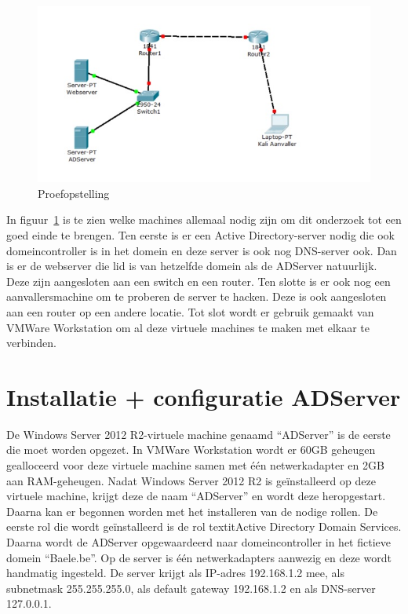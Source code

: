 \documentclass[pdftex,a4paper,12pt]{report}
\begin{document}
\begin{figure}[H]
\begin{center}
\includegraphics{img/Situatie}
\end{center}
\label{img:situatie}
\caption{Proefopstelling}
\end{figure}

In figuur~\ref{img:situatie} is te zien welke machines allemaal nodig zijn om dit onderzoek tot een goed einde te brengen. Ten eerste is er een Active Directory-server nodig die ook domeincontroller is in het domein en deze server is ook nog DNS-server ook. Dan is er de webserver die lid is van hetzelfde domein als de ADServer natuurlijk. Deze zijn aangesloten aan een switch en een router. Ten slotte is er ook nog een aanvallersmachine om te proberen de server te hacken. Deze is ook aangesloten aan een router op een andere locatie. Tot slot wordt er gebruik gemaakt van VMWare Workstation om al deze virtuele machines te maken met elkaar te verbinden.

\section{Installatie + configuratie ADServer}
De Windows Server 2012 R2-virtuele machine genaamd "`ADServer"' is de eerste die moet worden opgezet. In VMWare Workstation wordt er 60GB geheugen gealloceerd voor deze virtuele machine samen met één netwerkadapter en 2GB aan RAM-geheugen. Nadat Windows Server 2012 R2 is geïnstalleerd op deze virtuele machine, krijgt deze de naam "`ADServer"' en wordt deze heropgestart. Daarna kan er begonnen worden met het installeren van de nodige rollen. De eerste rol die wordt geïnstalleerd is de rol textit{Active Directory Domain Services}. Daarna wordt de ADServer opgewaardeerd naar domeincontroller in het fictieve domein "`Baele.be"'. Op de server is één netwerkadapters aanwezig en deze wordt handmatig ingesteld. De server krijgt als IP-adres 192.168.1.2 mee, als subnetmask 255.255.255.0, als default gateway 192.168.1.2 en als DNS-server 127.0.0.1. \newline
\end{document}
